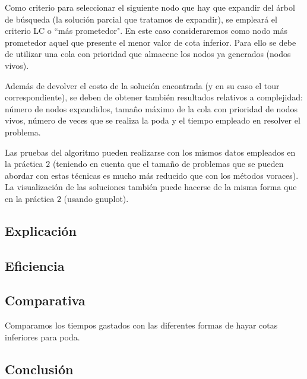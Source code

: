 Como criterio para seleccionar el siguiente nodo que hay que expandir del árbol de búsqueda
(la solución parcial que tratamos de expandir), se empleará el criterio LC o ``más prometedor".
En este caso consideraremos como nodo más prometedor aquel que presente el menor valor de
cota inferior. Para ello se debe de utilizar una cola con prioridad que almacene los nodos ya
generados (nodos vivos).

Además de devolver el costo de la solución encontrada (y en su caso el tour correspondiente),
se deben de obtener también resultados relativos a complejidad: número de nodos expandidos,
tamaño máximo de la cola con prioridad de nodos vivos, número de veces que se realiza la poda
y el tiempo empleado en resolver el problema.

Las pruebas del algoritmo pueden realizarse con los mismos datos empleados en la práctica
$2$ (teniendo en cuenta que el tamaño de problemas que se pueden abordar con estas técnicas es
mucho más reducido que con los métodos voraces). La visualización de las soluciones también
puede hacerse de la misma forma que en la práctica $2$ (usando gnuplot).

\subsection{Explicación}
\subsection{Eficiencia}
\subsection{Comparativa}
Comparamos los tiempos gastados con las diferentes formas de hayar cotas inferiores para poda.
\subsection{Conclusión}